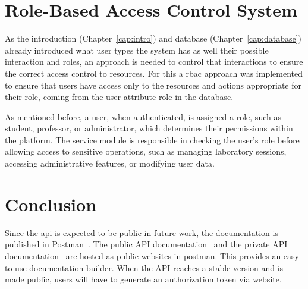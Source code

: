 \section{Role-Based Access Control System}
As the introduction (Chapter~\ref{cap:intro}) and database (Chapter~\ref{cap:database}) already introduced what user types the system has as well their possible interaction and roles, an approach is needed to control that interactions to ensure the correct access control to resources. For this a \ac{rbac} approach was implemented to ensure that users have access only to the resources and actions appropriate for their role, coming from the user attribute role in the database. 

As mentioned before, a user, when authenticated, is assigned a role, such as student, professor, or administrator, which determines their permissions within the platform. The service module is responsible in checking the user's role before allowing access to sensitive operations, such as managing laboratory sessions, accessing administrative features, or modifying user data. 

\section{Conclusion}

Since the \acs{api} is expected to be public in future work, the documentation is published in Postman~\cite{postman}. The public API documentation~\cite{public-api-documentation} and the private API documentation~\cite{private-api-documentation} are hosted as public websites in postman. This provides an easy-to-use documentation builder. When the API reaches a stable version and is made public, users will have to generate an authorization token via website. 